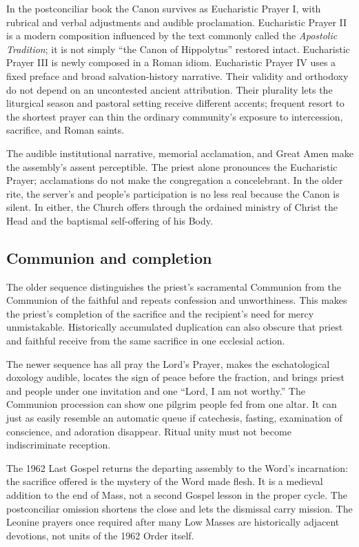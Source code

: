 In the postconciliar book the Canon survives as Eucharistic Prayer I, with rubrical and verbal adjustments and audible proclamation. Eucharistic Prayer II is a modern composition influenced by the text commonly called the \emph{Apostolic Tradition}; it is not simply “the Canon of Hippolytus” restored intact. Eucharistic Prayer III is newly composed in a Roman idiom. Eucharistic Prayer IV uses a fixed preface and broad salvation-history narrative. Their validity and orthodoxy do not depend on an uncontested ancient attribution. Their plurality lets the liturgical season and pastoral setting receive different accents; frequent resort to the shortest prayer can thin the ordinary community's exposure to intercession, sacrifice, and Roman saints.

The audible institutional narrative, memorial acclamation, and Great Amen make the assembly's assent perceptible. The priest alone pronounces the Eucharistic Prayer; acclamations do not make the congregation a concelebrant. In the older rite, the server's and people's participation is no less real because the Canon is silent. In either, the Church offers through the ordained ministry of Christ the Head and the baptismal self-offering of his Body.

\subsection{Communion and completion}

The older sequence distinguishes the priest's sacramental Communion from the Communion of the faithful and repeats confession and unworthiness. This makes the priest's completion of the sacrifice and the recipient's need for mercy unmistakable. Historically accumulated duplication can also obscure that priest and faithful receive from the same sacrifice in one ecclesial action.

The newer sequence has all pray the Lord's Prayer, makes the eschatological doxology audible, locates the sign of peace before the fraction, and brings priest and people under one invitation and one “Lord, I am not worthy.” The Communion procession can show one pilgrim people fed from one altar. It can just as easily resemble an automatic queue if catechesis, fasting, examination of conscience, and adoration disappear. Ritual unity must not become indiscriminate reception.

The 1962 Last Gospel returns the departing assembly to the Word's incarnation: the sacrifice offered is the mystery of the Word made flesh. It is a medieval addition to the end of Mass, not a second Gospel lesson in the proper cycle. The postconciliar omission shortens the close and lets the dismissal carry mission. The Leonine prayers once required after many Low Masses are historically adjacent devotions, not units of the 1962 Order itself.

